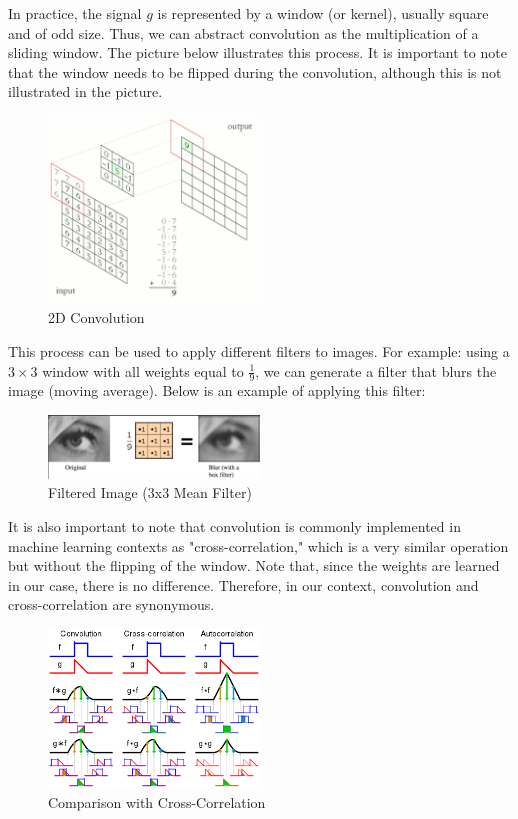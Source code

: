 In practice, the signal \(g\) is represented by a window (or kernel), usually square and of odd size. Thus, we can abstract convolution as the multiplication of a sliding window. The picture below illustrates this process. It is important to note that the window needs to be flipped during the convolution, although this is not illustrated in the picture.

\begin{figure}[h!]
    \centering
    \includegraphics[width=0.5\textwidth]{figuras/conv.png}
    \caption{2D Convolution}
\end{figure}

This process can be used to apply different filters to images. For example: using a \(3 \times 3\) window with all weights equal to \(\frac{1}{9}\), we can generate a filter that blurs the image (moving average). Below is an example of applying this filter:

\begin{figure}[h!]
    \centering
    \includegraphics[width=0.5\textwidth]{figuras/blur.png}
    \caption{Filtered Image (3x3 Mean Filter)}
\end{figure}

It is also important to note that convolution is commonly implemented in machine learning contexts as "cross-correlation," which is a very similar operation but without the flipping of the window. Note that, since the weights are learned in our case, there is no difference. Therefore, in our context, convolution and cross-correlation are synonymous.

\begin{figure}[h!]
    \centering
    \includegraphics[width=0.5\textwidth]{figuras/cross-correlation.png}
    \caption{Comparison with Cross-Correlation}
\end{figure}

